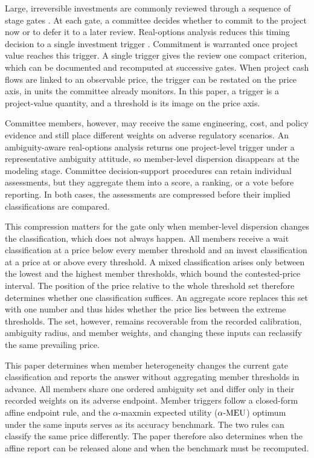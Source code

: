 Large, irreversible investments are commonly reviewed through a sequence of stage gates \citep{Cooper2008}. At each gate, a committee decides whether to commit to the project now or to defer it to a later review. Real-options analysis reduces this timing decision to a single investment trigger \citep{McDonaldSiegel1986,DixitPindyck1994}. Commitment is warranted once project value reaches this trigger. A single trigger gives the review one compact criterion, which can be documented and recomputed at successive gates. When project cash flows are linked to an observable price, the trigger can be restated on the price axis, in units the committee already monitors. In this paper, a trigger is a project-value quantity, and a threshold is its image on the price axis.

Committee members, however, may receive the same engineering, cost, and policy evidence and still place different weights on adverse regulatory scenarios. An ambiguity-aware real-options analysis returns one project-level trigger under a representative ambiguity attitude, so member-level dispersion disappears at the modeling stage. Committee decision-support procedures can retain individual assessments, but they aggregate them into a score, a ranking, or a vote before reporting. In both cases, the assessments are compressed before their implied classifications are compared.

This compression matters for the gate only when member-level dispersion changes the classification, which does not always happen. All members receive a wait classification at a price below every member threshold and an invest classification at a price at or above every threshold. A mixed classification arises only between the lowest and the highest member thresholds, which bound the contested-price interval. The position of the price relative to the whole threshold set therefore determines whether one classification suffices. An aggregate score replaces this set with one number and thus hides whether the price lies between the extreme thresholds. The set, however, remains recoverable from the recorded calibration, ambiguity radius, and member weights, and changing these inputs can reclassify the same prevailing price.

This paper determines when member heterogeneity changes the current gate classification and reports the answer without aggregating member thresholds in advance. All members share one ordered ambiguity set and differ only in their recorded weights on its adverse endpoint. Member triggers follow a closed-form affine endpoint rule, and the $\alpha$-maxmin expected utility ($\alpha\text{-MEU}$) optimum under the same inputs serves as its accuracy benchmark. The two rules can classify the same price differently. The paper therefore also determines when the affine report can be released alone and when the benchmark must be recomputed.


